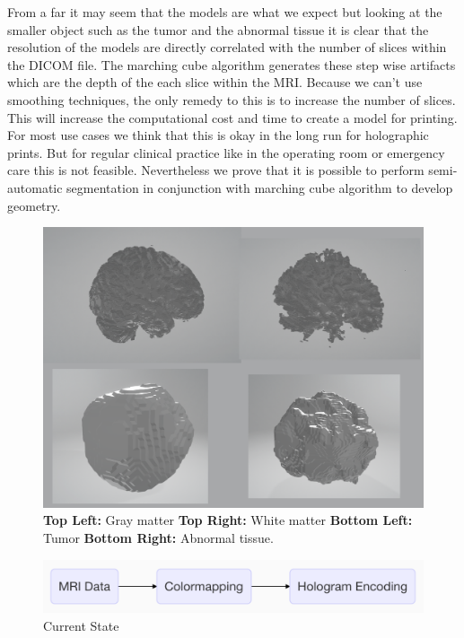 From a far it may seem that the models are what we expect but looking at the smaller object such as the tumor and the abnormal tissue it is clear that the resolution of the models are directly correlated with the number of slices within the DICOM file.  The marching cube algorithm generates these step wise artifacts which are the depth of the each slice within the MRI.  Because we can't use smoothing techniques, the only remedy to this is to increase the number of slices.  This will increase the computational cost and time to create a model for printing.  For most use cases we think that this is okay in the long run for holographic prints.  But for regular clinical practice like in the operating room or emergency care this is not feasible.  Nevertheless we prove that it is possible to perform semi-automatic segmentation in conjunction with marching cube algorithm to develop geometry.\\

\begin{figure}[h]
  \centering
  \includegraphics[width=\linewidth]{pictures/resultsMarchingCube.PNG}
  \caption{\textbf{Top Left:} Gray matter \textbf{Top Right:} White matter \textbf{Bottom Left:} Tumor \textbf{Bottom Right:} Abnormal tissue.}
  \label{fig:resultsMarchingCube}
\end{figure}

\begin{figure}[h]
 \centering %
 \includegraphics[width=\columnwidth]{pictures/general-model.png}
 \caption{Current State}
 \label{fig:general-model}
\end{figure}

